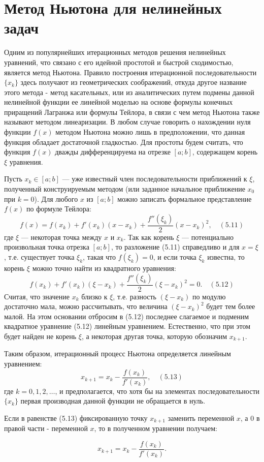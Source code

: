 \documentclass{article}
\begin{document}
\section{Метод Ньютона для нелинейных задач}

Одним из популярнейших итерационных методов решения нелинейных уравнений, что связано с его идейной простотой и быстрой сходимостью, является метод Ньютона. Правило построения итерационной последовательности \( \{x_k\} \) здесь получают из геометрических соображений, откуда другое название этого метода - метод касательных, или из аналитических путем подмены данной нелинейной функции ее линейной моделью на основе формулы конечных приращений Лагранжа или формулы Тейлора, в связи с чем метод Ньютона также называют методом линеаризации. В любом случае говорить о нахождении нуля функции \( f(x) \) методом Ньютона можно лишь в предположении, что данная функция обладает достаточной гладкостью. Для простоты будем считать, что функция \( f(x) \) дважды дифференцируема на отрезке \([a; b]\), содержащем корень \( \xi \) уравнения.

Пусть \( x_k \in [a; b] \) — уже известный член последовательности приближений к \( \xi \), полученный конструируемым методом (или заданное начальное приближение \( x_0 \) при \( k=0 \)). Для любого \( x \) из \([a; b]\) можно записать формальное представление \( f(x) \) по формуле Тейлора:
\[
f(x) = f(x_k) + f'(x_k)(x - x_k) + \frac{f''(\xi_k)}{2}(x - x_k)^2, \quad (5.11)
\]
где \( \xi \) — некоторая точка между \( x \) и \( x_k \). Так как корень \( \xi \) — потенциально произвольная точка отрезка \([a; b]\), то разложение (5.11) справедливо и для \( x = \xi \), т.е. существует точка \( \xi_k \), такая что \( f(\xi_k) = 0 \), и если точка \( \xi_k \) известна, то корень \( \xi \) можно точно найти из квадратного уравнения:
\[
f(x_k) + f'(x_k)(\xi - x_k) + \frac{f''(\xi_k)}{2}(\xi - x_k)^2 = 0. \quad (5.12)
\]
Считая, что значение \( x_k \) близко к \( \xi \), т.е. разность \( (\xi - x_k) \) по модулю достаточно мала, можно рассчитывать, что величина \( (\xi - x_k)^2 \) будет тем более малой. На этом основании отбросим в (5.12) последнее слагаемое и подменим квадратное уравнение (5.12) линейным уравнением. Естественно, что при этом будет найден не корень \( \xi \), а некоторая другая точка, которую обозначим \( x_{k+1} \).

Таким образом, итерационный процесс Ньютона определяется линейным уравнением:
\[
x_{k+1} = x_k - \frac{f(x_k)}{f'(x_k)}, \quad (5.13)
\]
где \( k = 0, 1, 2, \ldots \), и предполагается, что хотя бы на элементах последовательности \( \{x_k\} \) первая производная данной функции не обращается в нуль.

Если в равенстве (5.13) фиксированную точку \( x_{k+1} \) заменить переменной \( x \), а 0 в правой части - переменной \( x \), то в полученном уравнении получаем:

\[
x_{k+1} = x_k - \frac{f(x_k)}{f'(x_k)}.
\]
\end{document}
